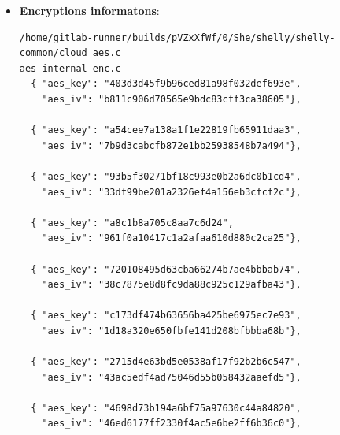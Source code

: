 \begin{itemize}
\vspace{0.1cm}
\begin{verbatim}
-----BEGIN CERTIFICATE-----
MIIC+TCCAeGgAwIBAgIJAPTc08oPlcrHMA0GCSqGSIb3DQEBCwUAMBMxETAPBgNV
BAoMCEFsbHRlcmNvMB4XDTE3MDIwMzEzMjUxMFoXDTE5MTEyNDEzMjUxMFowEzER
MA8GA1UECgwIQWxsdGVyY28wggEiMA0GCSqGSIb3DQEBAQUAA4IBDwAwggEKAoIB
AQDHGDBDHpPUbtC9QAAjX3bi487A
VY5JgYB2gyp6R9cjdsNGMbYnWdxnBmsIUKJP
g7B5NcQObiMe6djUvwo0c2Xl9L+P9LOskP2WNDdpquX3XJu580hXHHVBmwOgJ0fi
+5U9mOFHhc1gYGLmhO9oqsE80SgpmsPQHloMIqmcaolLzgC9PWGu8nSDToJq+dXy
NFHzLVyBEugHQpeIR8Fq0do4dtlsfTWvv9U+fpGPegjdkPenSxGrOVwdsyFzNahx
QGKmpZE/1fsq5QSh9+Z
gwpdDChVNpkj9TBC1ApDTUasNco/6Meb/0XurpxpWPNfk
IpZ7ebtGHVd/ZkGTPUnL7FXHAgMBAAGjUDBOMB0GA1UdDgQWBBRn4Wja69QmBliB
fIg3fkettiukNDAfBgNVHSMEGDAWgBRn4Wja69QmBliBfIg3fkettiukNDAMBgNV
HRMEBTADAQH/MA0GCSqGSIb3DQEBCwUAA4IBAQBJ3GGiYs8w65ZK2bn+r6orN6Ni
FJv9r2vTxK
Arv5iSzvMky4L+8V6xBE4iCR1bfPMP/Iz8yfNEH3wStpBdyctjik8B
VX3XgiDmO0lZFRyMT6F4Z+H9obqYu3dMSGtQrfsVHqlBQVWjbXQSTmCvAQBLRym0
FT8mQ6Qt/bvb2F2y1QtFhHWqUnjiwWui5F2+hb2xJdI80QSI1v0tw4V0IaOHcPQT
3QAyDHujNhZGfeY9m8vJFfEDe2JvMx+wp27V5AyRMO0nfk8yJDSUSBXLpkH6ExkH
aUta9TCY9Mg7vLEmM7H2LTrVawi1PrZj2gEdkEZL/9r2H1PAN7NQtpG9Mur
-----END CERTIFICATE-----
    \end{verbatim}

\item \textbf{Encryptions informatons}:

\begin{verbatim}
/home/gitlab-runner/builds/pVZxXfWf/0/She/shelly/shelly-common/cloud_aes.c
aes-internal-enc.c
  { "aes_key": "403d3d45f9b96ced81a98f032def693e",
    "aes_iv": "b811c906d70565e9bdc83cff3ca38605"},
  
  { "aes_key": "a54cee7a138a1f1e22819fb65911daa3",
    "aes_iv": "7b9d3cabcfb872e1bb25938548b7a494"},
  
  { "aes_key": "93b5f30271bf18c993e0b2a6dc0b1cd4",
    "aes_iv": "33df99be201a2326ef4a156eb3cfcf2c"},
  
  { "aes_key": "a8c1b8a705c8aa7c6d24",
    "aes_iv": "961f0a10417c1a2afaa610d880c2ca25"},
  
  { "aes_key": "720108495d63cba66274b7ae4bbbab74",
    "aes_iv": "38c7875e8d8fc9da88c925c129afba43"},
  
  { "aes_key": "c173df474b63656ba425be6975ec7e93",
    "aes_iv": "1d18a320e650fbfe141d208bfbbba68b"},
  
  { "aes_key": "2715d4e63bd5e0538af17f92b2b6c547",
    "aes_iv": "43ac5edf4ad75046d55b058432aaefd5"},
  
  { "aes_key": "4698d73b194a6bf75a97630c44a84820",
    "aes_iv": "46ed6177ff2330f4ac5e6be2ff6b36c0"},
  

\end{verbatim}
\end{itemize}
